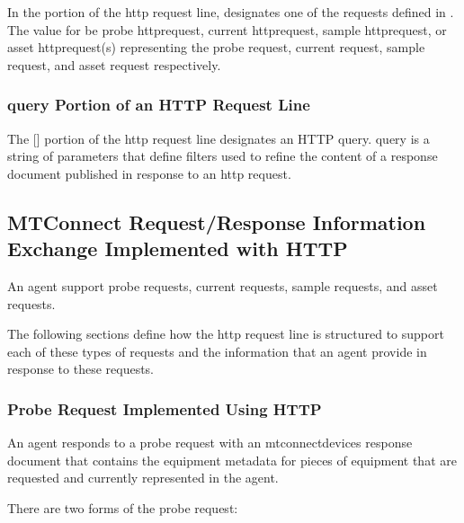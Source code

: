 \documentclass{mtconnect}	%
\begin{document}
In the  portion of the \gls{http request line},  designates one of the \glspl{request} defined in .  The value for  \MUST be \gls{probe httprequest}, \gls{current httprequest}, \gls{sample httprequest}, or \gls{asset httprequest}(s) representing the \gls{probe request}, \gls{current request}, \gls{sample request}, and \gls{asset request} respectively.  

\subsubsection{query Portion of an HTTP Request Line}

The [] portion of the \gls{http request line} designates an HTTP \gls{query}.  \gls{query} is a string of parameters that define filters used to refine the content of a \gls{response document} published in response to an \gls{http request}. 

\subsection{MTConnect Request/Response Information Exchange Implemented with HTTP}

An \gls{agent} \MUST support \glspl{probe request}, \glspl{current request}, \glspl{sample request}, and \glspl{asset request}.

The following sections define how the \gls{http request line} is structured to support each of these types of \glspl{request} and the information that an \gls{agent} \MUST provide in response to these \glspl{request}.

\subsubsection{Probe Request Implemented Using HTTP}

An \gls{agent} responds to a \gls{probe request} with an \gls{mtconnectdevices response document} that contains the \gls{equipment metadata} for pieces of equipment that are requested and currently represented in the \gls{agent}.  

There are two forms of the \gls{probe request}:
\end{document}

